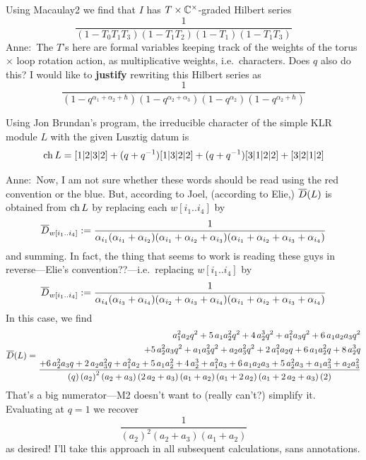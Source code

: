 \documentclass[11pt]{article}
\newcommand{\anne}[1]{{\color{pink!50!blue}Anne:~#1}}
\newcommand{\todo}[1]{{\color{red!50!white}\textbf{#1}}} %
\begin{document}
\begin{description}
Using Macaulay2 we find that $I$ has $T\times\mathbb C^\times$-graded Hilbert series
\[
    \frac{1}{\left(1-{T}_{0}{T}_{1}{T}_{3}\right)\left(1-{T}_{1}{T}_{2}\right)\left(1-{T}_{1}\right)\left(1-{T}_{1}{T}_{3}\right)}    
\]
\anne{The $T$'s here are formal variables keeping track of the weights of the torus $\times$ loop rotation action, as multiplicative weights, i.e.\ characters. 
Does $q$ also do this? I would like to \todo{justify} rewriting this Hilbert series as 
\[
    \frac{1}{(1 - q^{\alpha_1 + \alpha_2 + \hbar})(1-q^{\alpha_2 + \alpha_3})(1-q^{\alpha_2})(1-q^{\alpha_2 + \hbar})}    
\]
}

Using Jon Brundan's program, the irreducible character of the simple KLR module $L$ with the given Lusztig datum is 
\[
    \operatorname{ch} L = [1|2|3|2]+(q+q^{-1})[1|3|2|2]+(q+q^{-1})[3|1|2|2]+[3|2|1|2]
\]
\anne{Now, I am not sure whether these words should be read using the red convention or the blue. But, according to Joel, (according to Elie,) $\overline{D}(L)$  is obtained from $\operatorname{ch} L$ by replacing each $w[i_1..i_4]$ by 
$$\overline{D}_{w[i_1..i_4]}:= \frac 1 {\alpha_{i_1}(\alpha_{i_1} + \alpha_{i_2})(\alpha_{i_1} + \alpha_{i_2} + \alpha_{i_3})(\alpha_{i_1}+\alpha_{i_2} + \alpha_{i_3}+\alpha_{i_4})}$$ and summing. In fact, the thing that seems to work is reading these guys in reverse---Elie's convention??---i.e.\ replacing $w[i_1..i_4]$ by 
$$\overline{D}_{w[i_1..i_4]}:= \frac 1 {\alpha_{i_4}(\alpha_{i_3} + \alpha_{i_4})(\alpha_{i_2} + \alpha_{i_3} + \alpha_{i_4})(\alpha_{i_1}+\alpha_{i_2} + \alpha_{i_3}+\alpha_{i_4})}$$ 
In this case, we find %
{\tiny
$$
\overline{D} (L) =
\begin{aligned}{a}_{1}^{2}{a}_{2}q^{2}+5\,{a}_{1}{a}_{2}^{2}q^{2}+4\,{a}_{2}^{3}q^{2}+{a}_{1}^{2}{a}_{3}q^{2}+6\,{a}_{1}{a}_{2}{a}_{3}q^{2}\\
    +5\,{a}_{2}^{2}{a}_{3}q^{2}+{a}_{1}{a}_{3}^{2}q^{2}+{a}_{2}{a}_{3}^{2}q^{2}+2\,{a}_{1}^{2}{a}_{2}q+6\,{a}_{1}{a}_{2}^{2}q+8\,{a}_{2}^{3}q \\ 
    \frac{+6\,{a}_{2}^{2}{a}_{3}q+2\,{a}_{2}{a}_{3}^{2}q+{a}_{1}^{2}{a}_{2}+5\,{a}_{1}{a}_{2}^{2}+4\,{a}_{2}^{3}+{a}_{1}^{2}{a}_{3}+6\,{a}_{1}{a}_{2}{a}_{3}+5\,{a}_{2}^{2}{a}_{3}+{a}_{1}{a}_{3}^{2}+{a}_{2}{a}_{3}^{2}}{\left(q\right)\left({{a}_{2}}\right)^{2}\left({a}_{2}+{a}_{3}\right)\left(2\,{a}_{2}+{a}_{3}\right)\left({a}_{1}+{a}_{2}\right)\left({a}_{1}+2\,{a}_{2}\right)\left({a}_{1}+2\,{a}_{2}+{a}_{3}\right)\left(2\right)}
\end{aligned}
$$}
That's a big numerator---M2 doesn't want to (really can't?) simplify it. 
Evaluating at $q = 1$ we recover
$$\frac{1}{\left({{a}_{2}}\right)^{2}\left({a}_{2}+{a}_{3}\right)\left({a
      }_{1}+{a}_{2}\right)}$$
as desired! I'll take this approach in all subsequent calculations, sans annotations. 

}
\end{description}
\end{document}
